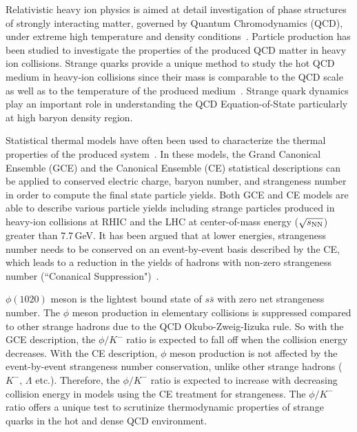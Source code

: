 \documentclass[%
 reprint,	
showpacs,
 amsmath,amssymb,
 aps,
 prc,
]{revtex4-1}
\begin{document}
\maketitle


Relativistic heavy ion physics is aimed at detail investigation of phase structures of strongly interacting matter, governed by Quantum Chromodynamics (QCD), under extreme high temperature and density conditions~\cite{akiba2015hot,StarWhitePaper}. Particle production has been studied to investigate the properties of the produced QCD matter in heavy ion collisions. Strange quarks provide a unique method to study the hot QCD medium in heavy-ion collisions since their mass is comparable to the QCD scale as well as to the temperature of the produced medium~\cite{Rafelski:1982pu,Koch:1986ud}. Strange quark dynamics play an important role in understanding the QCD Equation-of-State particularly at high baryon density region. 

Statistical thermal models have often been used to characterize the thermal properties of the produced system~\cite{BraunMunzinger:2003zd,Redlich_CE}. In these models, the Grand Canonical Ensemble (GCE) and the Canonical Ensemble (CE) statistical descriptions can be applied to conserved electric charge, baryon number, and strangeness number in order to compute the final state particle yields. Both GCE and CE models are able to describe various particle yields including strange particles produced in heavy-ion collisions at RHIC and the LHC at center-of-mass energy ($\sqrt{s_{\rm NN}}$) greater than 7.7\,GeV. It has been argued that at lower energies, strangeness number needs to be conserved on an event-by-event basis described by the CE, which leads to a reduction in the yields of hadrons with non-zero strangeness number (``Conanical Suppression")~\cite{Redlich:2001kb}.

$\phi(1020)$ meson is the lightest bound state of $s\bar{s}$ with zero net strangeness number. The $\phi$ meson production in elementary collisions is suppressed compared to other strange hadrons due to the QCD Okubo-Zweig-Iizuka rule. So with the GCE description, the $\phi/K^-$ ratio is expected to fall off when the collision energy decreases. With the CE description, $\phi$ meson production is not affected by the event-by-event strangeness number conservation, unlike other strange hadrons ($K^-$, $\Lambda$ etc.). Therefore, the $\phi/K^-$ ratio is expected to increase with decreasing collision energy in models using the CE treatment for strangeness. The $\phi/K^-$ ratio offers a unique test to scrutinize thermodynamic properties of strange quarks in the hot and dense QCD environment.
\end{document}
